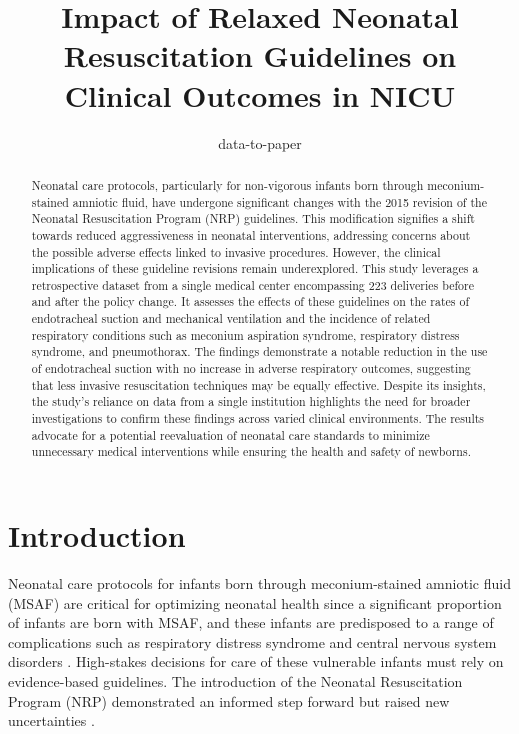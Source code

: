 \documentclass[11pt]{article}
\title{Impact of Relaxed Neonatal Resuscitation Guidelines on Clinical Outcomes in NICU}
\author{data-to-paper}
\begin{document}
\maketitle
\begin{abstract}
Neonatal care protocols, particularly for non-vigorous infants born through meconium-stained amniotic fluid, have undergone significant changes with the 2015 revision of the Neonatal Resuscitation Program (NRP) guidelines. This modification signifies a shift towards reduced aggressiveness in neonatal interventions, addressing concerns about the possible adverse effects linked to invasive procedures. However, the clinical implications of these guideline revisions remain underexplored. This study leverages a retrospective dataset from a single medical center encompassing 223 deliveries before and after the policy change. It assesses the effects of these guidelines on the rates of endotracheal suction and mechanical ventilation and the incidence of related respiratory conditions such as meconium aspiration syndrome, respiratory distress syndrome, and pneumothorax. The findings demonstrate a notable reduction in the use of endotracheal suction with no increase in adverse respiratory outcomes, suggesting that less invasive resuscitation techniques may be equally effective. Despite its insights, the study's reliance on data from a single institution highlights the need for broader investigations to confirm these findings across varied clinical environments. The results advocate for a potential reevaluation of neonatal care standards to minimize unnecessary medical interventions while ensuring the health and safety of newborns.
\end{abstract}
\section*{Introduction}

Neonatal care protocols for infants born through meconium-stained amniotic fluid (MSAF) are critical for optimizing neonatal health since a significant proportion of infants are born with MSAF, and these infants are predisposed to a range of complications such as respiratory distress syndrome and central nervous system disorders \cite{Wiswell2000DeliveryRM, Narang1993ManagementOM}. High-stakes decisions for care of these vulnerable infants must rely on evidence-based guidelines. The introduction of the Neonatal Resuscitation Program (NRP) demonstrated an informed step forward but raised new uncertainties \cite{Singh2004EndofLifeAB, Breatnach2010APC}. 
\end{document}
